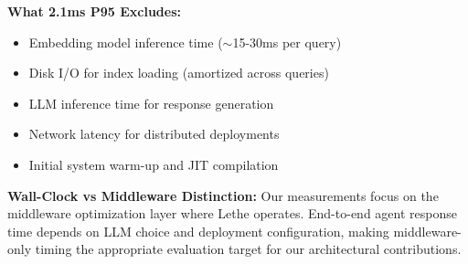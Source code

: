 \textbf{What 2.1ms P95 Excludes:}
\begin{itemize}
    \item Embedding model inference time ($\sim$15-30ms per query)
    \item Disk I/O for index loading (amortized across queries)
    \item LLM inference time for response generation
    \item Network latency for distributed deployments
    \item Initial system warm-up and JIT compilation
\end{itemize}

\textbf{Wall-Clock vs Middleware Distinction:}
Our measurements focus on the middleware optimization layer where Lethe operates. End-to-end agent response time depends on LLM choice and deployment configuration, making middleware-only timing the appropriate evaluation target for our architectural contributions.